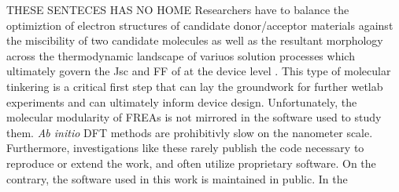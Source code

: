THESE SENTECES HAS NO HOME Researchers have to
balance the optimiztion of electron structures of candidate donor/acceptor materials against the miscibility
of two candidate molecules as well as the resultant morphology across the thermodynamic landscape of
variuos solution processes which ultimately govern the Jsc and FF of at the device level \cite{Zhu2020a}. 
This type of molecular tinkering is a critical first step that can lay the groundwork for further wetlab
experiments and can ultimately inform device design. Unfortunately, the molecular modularity of FREAs is not
mirrored in the software used to study them. \textit{Ab initio} DFT methods are prohibitivly slow on the nanometer
scale. Furthermore, investigations like these rarely publish the code necessary to reproduce or extend the
work, and often utilize proprietary software. On the contrary, the software used in this 
work is maintained in public. In the
